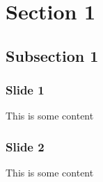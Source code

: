 \documentclass{beamer}
\begin{document}
    \begin{frame}
        \tableofcontents
    \end{frame}

    \section{Section 1}
    \subsection{Subsection 1}

    \begin{frame}
        \frametitle{Slide 1}
        This is some content
    \end{frame}

    \begin{frame}
        \frametitle{Slide 2}
        This is some content
    \end{frame} 
\end{document}
